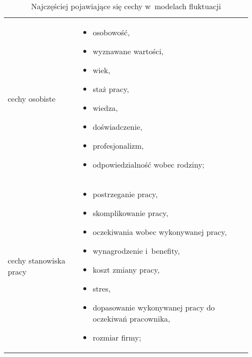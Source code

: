 \noindent\begin{minipage}{\textwidth}
             \begin{table}[H]
                 \raggedright\caption{Najczęściej pojawiające się cechy w~modelach fluktuacji\label{tabela:fluktuacja-cechy}}
                 \begin{center}
                     \begin{tabular}{|P{.2\textwidth}|P{.7\textwidth}|}

                         \hline
                          &
                          \\
                         \hline

                         cechy osobiste &
                         \begin{itemize}
                             \item osobowość,
                             \item wyznawane wartości,
                             \item wiek,
                             \item staż pracy,
                             \item wiedza,
                             \item doświadczenie,
                             \item profesjonalizm,
                             \item odpowiedzialność wobec rodziny;
                         \end{itemize} \\

                         \hline

                         cechy stanowiska pracy &
                         \begin{itemize}
                             \item postrzeganie pracy,
                             \item skomplikowanie pracy,
                             \item oczekiwania wobec wykonywanej pracy,
                             \item wynagrodzenie i~benefity,
                             \item koszt zmiany pracy,
                             \item stres,
                             \item dopasowanie wykonywanej pracy do oczekiwań pracownika,
                             \item rozmiar firmy;
                         \end{itemize} \\
                         \hline


\end{tabular}
\end{center}
\end{table}
\end{minipage}

